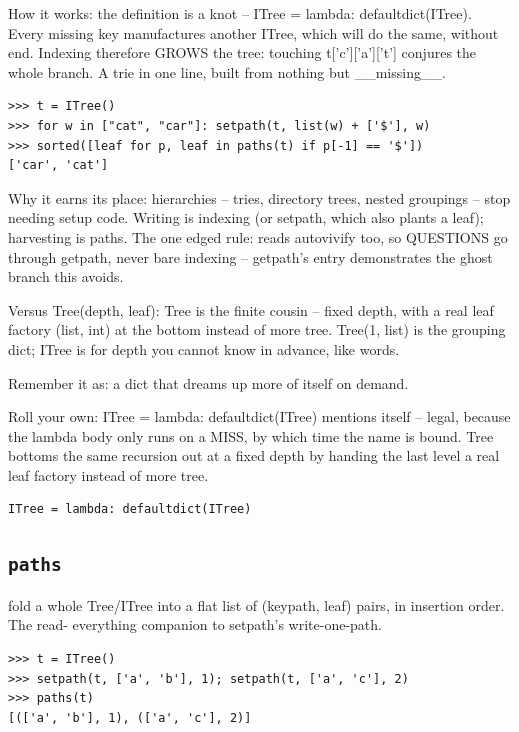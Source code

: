 \documentclass[10pt,letterpaper]{book}
\begin{document}
How it works: the definition is a knot -- ITree = lambda: defaultdict(ITree). Every missing key manufactures another ITree, which will do the same, without end. Indexing therefore GROWS the tree: touching t['c']['a']['t'] conjures the whole branch. A trie in one line, built from nothing but \_\_missing\_\_.

\begin{lstlisting}[style=ex]
>>> t = ITree()
>>> for w in ["cat", "car"]: setpath(t, list(w) + ['$'], w)
>>> sorted([leaf for p, leaf in paths(t) if p[-1] == '$'])
['car', 'cat']
\end{lstlisting}

Why it earns its place: hierarchies -- tries, directory trees, nested groupings -- stop needing setup code. Writing is indexing (or setpath, which also plants a leaf); harvesting is paths. The one edged rule: reads autovivify too, so QUESTIONS go through getpath, never bare indexing -- getpath's entry demonstrates the ghost branch this avoids.


Versus Tree(depth, leaf): Tree is the finite cousin -- fixed depth, with a real leaf factory (list, int) at the bottom instead of more tree. Tree(1, list) is the grouping dict; ITree is for depth you cannot know in advance, like words.


Remember it as: a dict that dreams up more of itself on demand.


Roll your own: ITree = lambda: defaultdict(ITree) mentions itself -- legal, because the lambda body only runs on a MISS, by which time the name is bound. Tree bottoms the same recursion out at a fixed depth by handing the last level a real leaf factory instead of more tree.

\begin{lstlisting}[style=ex]
ITree = lambda: defaultdict(ITree)
\end{lstlisting}

\subsection{\texttt{paths}}\label{def:paths}
fold a whole Tree/ITree into a flat list of (keypath, leaf) pairs, in insertion order. The read- everything companion to setpath's write-one-path.
\begin{lstlisting}[style=ex]
>>> t = ITree()
>>> setpath(t, ['a', 'b'], 1); setpath(t, ['a', 'c'], 2)
>>> paths(t)
[(['a', 'b'], 1), (['a', 'c'], 2)]
\end{lstlisting}
\end{document}
